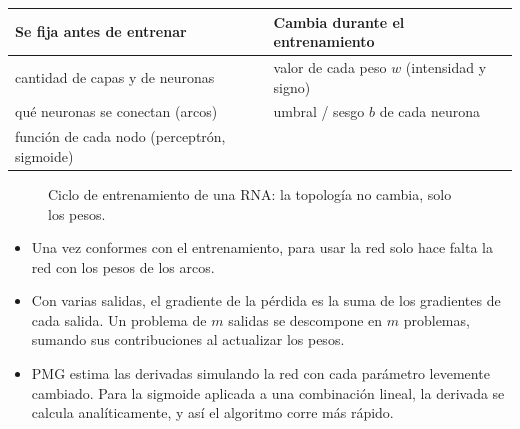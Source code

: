 \documentclass[11pt,a4paper]{article}
\begin{document}
\begin{center}
\small
\begin{tabularx}{\linewidth}{@{}X X@{}}
\toprule
\textbf{Se fija antes de entrenar} & \textbf{Cambia durante el entrenamiento} \\
\midrule
cantidad de capas y de neuronas & valor de cada peso $w$ (intensidad y signo) \\
qué neuronas se conectan (arcos) & umbral / sesgo $b$ de cada neurona \\
función de cada nodo (perceptrón, sigmoide) & \\
\bottomrule
\end{tabularx}
\end{center}

\begin{figure}[h]
\centering
{}
\caption{Ciclo de entrenamiento de una RNA: la topología no cambia, solo los pesos.}
\end{figure}

\begin{extras}
\begin{itemize}
  \item Una vez conformes con el entrenamiento, para usar la red solo hace falta la red con los pesos de los arcos.
  \item Con varias salidas, el gradiente de la pérdida es la suma de los gradientes de cada salida. Un problema de $m$ salidas se descompone en $m$ problemas, sumando sus contribuciones al actualizar los pesos.
  \item PMG estima las derivadas simulando la red con cada parámetro levemente cambiado. Para la sigmoide aplicada a una combinación lineal, la derivada se calcula analíticamente, y así el algoritmo corre más rápido.
\end{itemize}
\end{extras}
\end{document}

